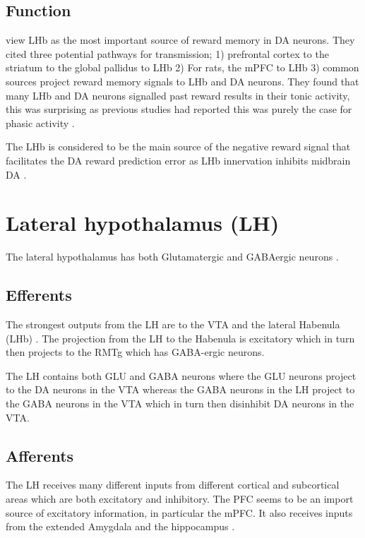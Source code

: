 \documentclass[12pt,a4paper]{article}
\begin{document}
\subsection{Function}
\citet{Bromberg-Martin2010} view LHb as the most important
source of reward memory in DA neurons. They cited three potential pathways
for transmission; 1) prefrontal cortex to the striatum to the global
pallidus to LHb 2) For rats, the mPFC to LHb 3) common sources project
reward memory signals to LHb and DA neurons. They found that many LHb
and DA neurons signalled past reward results in their tonic activity,
this was surprising as previous studies had reported this was purely
the case for phasic activity .

The LHb is considered to be the main source of the negative reward signal
that facilitates the DA reward prediction error as LHb innervation
inhibits midbrain
DA \citep{Shen2012, Shabel2012, Matsumoto2007, Barrot2012}.








\section{Lateral hypothalamus (LH)}
The lateral hypothalamus has both Glutamatergic and GABAergic neurons \citep{Stanley2011}.

\subsection{Efferents}
The strongest outputs from the LH are to the VTA and the lateral
Habenula (LHb) \citep{Stuber2016}.  The projection from the LH to the
Habenula is excitatory \citep{Poller2013} which in turn then projects
to the RMTg which has GABA-ergic neurons.

The LH contains both GLU and GABA neurons where the GLU neurons
project to the DA neurons in the VTA whereas the GABA neurons in the
LH project to the GABA neurons in the VTA which in turn then
disinhibit DA neurons in the VTA.


\subsection{Afferents}
The LH receives many different inputs from different cortical and
subcortical areas which are both excitatory and inhibitory. The PFC
seems to be an import source of excitatory information, in particular
the mPFC. It also receives inputs from the extended Amygdala and the
hippocampus \citep{Stuber2016}.
\end{document}
